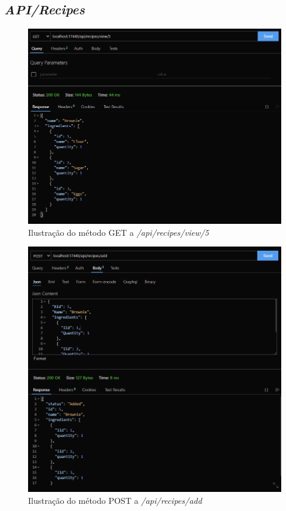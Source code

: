 \newpage
\subsection{\textit{API/Recipes}}

\begin{figure}[!hbt]
    \centering
    \includegraphics[width=14cm]{Resources/API/Recipes/Recipes (1).png}
    \caption{Ilustração do método GET a \textit{/api/recipes/view/5}}
    \label{fig:api_rec_1}
\end{figure}
\FloatBarrier
\begin{figure}[!hbt]
    \centering
    \includegraphics[width=14cm]{Resources/API/Recipes/Recipes (2).png}
    \caption{Ilustração do método POST a \textit{/api/recipes/add}}
    \label{fig:api_rec_2}
\end{figure}
